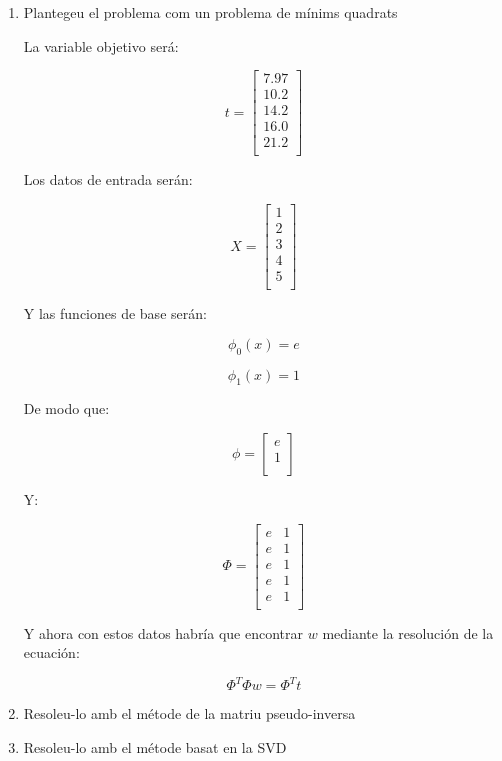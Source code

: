 \documentclass[a4paper]{article}
\begin{document}
\begin{enumerate}
  \item Plantegeu el problema com un problema de mínims quadrats

  La variable objetivo será:

\begin{equation*}
  t =
  \begin{bmatrix}
7.97 \\
10.2 \\
14.2 \\
16.0 \\
21.2 \\
  \end{bmatrix}
\end{equation*}

Los datos de entrada serán:

\begin{equation*}
  X =
  \begin{bmatrix}
    1 \\
    2 \\
    3 \\
    4 \\
    5 \\
  \end{bmatrix}
\end{equation*}

Y las funciones de base serán:

\begin{equation*}
  \phi_0(x) = e
\end{equation*}

\begin{equation*}
  \phi_1(x) = 1
\end{equation*}

De modo que:

\begin{equation*}
  \phi =
  \begin{bmatrix}
    e \\
    1 \\
  \end{bmatrix}
\end{equation*}


Y:

\begin{equation*}
  \Phi =
  \begin{bmatrix}
    e & 1 \\
    e & 1\\
    e & 1 \\
    e & 1 \\
    e & 1 \\
  \end{bmatrix}
\end{equation*}


Y ahora con estos datos habría que encontrar $w$ mediante la resolución de
la ecuación:

\begin{equation*}
  \Phi^T\Phi w = \Phi^T t
\end{equation*}


  \item Resoleu-lo amb el métode de la matriu pseudo-inversa
  \item Resoleu-lo amb el métode basat en la SVD
\end{enumerate}
\end{document}
